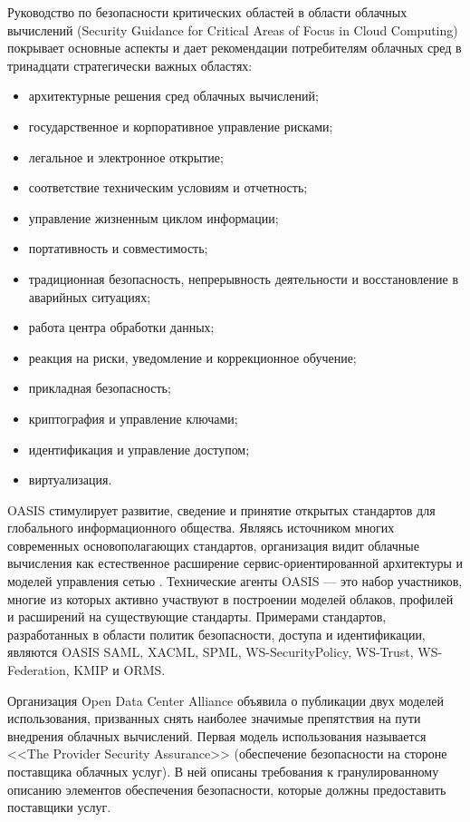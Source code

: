 Руководство по безопасности критических областей в области облачных вычислений (Security Guidance for Critical Areas of Focus in Cloud Computing) покрывает основные аспекты и дает рекомендации потребителям облачных сред в тринадцати стратегически важных областях:
\begin{itemize}
  \item архитектурные решения сред облачных вычислений;
  \item государственное и корпоративное управление рисками;
  \item легальное и электронное открытие;
  \item соответствие техническим условиям и отчетность;
  \item управление жизненным циклом информации;
  \item портативность и совместимость;
  \item традиционная безопасность, непрерывность деятельности и восстановление в аварийных ситуациях;
  \item работа центра обработки данных;
  \item реакция на риски, уведомление и коррекционное обучение;
  \item прикладная безопасность;
  \item криптография и управление ключами;
  \item идентификация и управление доступом;
  \item виртуализация.
\end{itemize}

OASIS стимулирует развитие, сведение и принятие открытых стандартов для глобального информационного общества. Являясь источником многих современных основополагающих стандартов, организация видит облачные вычисления как естественное расширение сервис-ориентированной архитектуры и моделей управления сетью \cite{psta}.
Технические агенты OASIS –– это набор участников, многие из которых активно участвуют в построении моделей облаков, профилей и расширений на существующие стандарты.
Примерами стандартов, разработанных в области политик безопасности, доступа и идентификации, являются OASIS SAML, XACML, SPML, WS-SecurityPolicy, WS-Trust, WS-Federation, KMIP и ORMS.

Организация Open Data Center Alliance объявила о публикации двух моделей использования, призванных снять наиболее значимые препятствия на пути внедрения облачных вычислений.
Первая модель использования называется <<The Provider Security Assurance>> (обеспечение безопасности на стороне поставщика облачных услуг).
В ней описаны требования к гранулированному описанию элементов обеспечения безопасности, которые должны предоставить поставщики услуг.

